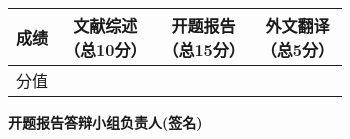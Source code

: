 {{		\vspace{10em}

		{
			\renewcommand{\baselinestretch}{1}
			\songti\sihao\bfseries
			\begin{flushright}

				\begin{tabular}{|c|c|c|c|}
					\hline
					成绩 & \parbox[c]{4em}{\vspace{0.5em}\xiaosi 文献综述                              \\ （总10分） \vspace{0.5em}} & \parbox[c]{4em}{\vspace{0.5em}\xiaosi 开题报告 \\ （总15分） \vspace{0.5em}} & \parbox[c]{4em}{\vspace{0.5em}\xiaosi 外文翻译 \\ （总5分） \vspace{0.5em}} \\
					\hline
					分值 & {}                                    & {} & {} \\
					\hline
				\end{tabular}

				\vspace{2em}

				{
					\songti\xiaosi\bfseries
					开题报告答辩小组负责人(签名) \; \underline{\hspace{6em}} \par
				}
			\end{flushright}
		}
	}









}
